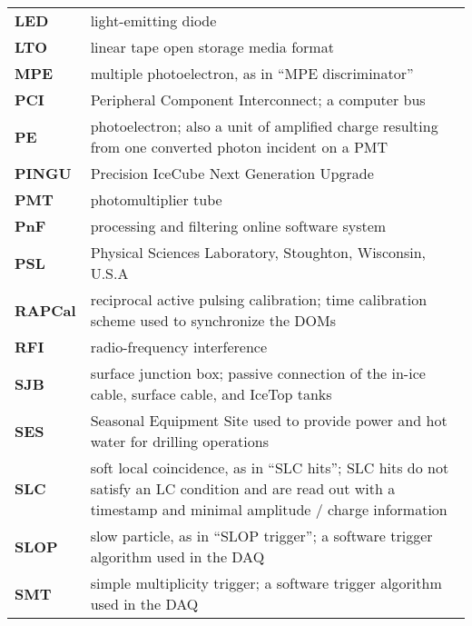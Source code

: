 \begin{longtable}{p{} p{}}
  \textbf{LED} & light-emitting diode \\

  \textbf{LTO} & linear tape open storage media format \\
  
  \textbf{MPE} & multiple photoelectron, as in ``MPE discriminator'' \\

  \textbf{PCI} & Peripheral Component Interconnect; a computer bus \\
  
  \textbf{PE} & photoelectron; also a unit of amplified charge resulting
  from one converted photon incident on a PMT \\

  \textbf{PINGU} & Precision IceCube Next Generation Upgrade \\
  
  \textbf{PMT} & photomultiplier tube \\

  \textbf{PnF} & processing and filtering online software system \\
  
  \textbf{PSL} & Physical Sciences Laboratory, Stoughton, Wisconsin, U.S.A \\

  \textbf{RAPCal} & reciprocal active pulsing calibration; time calibration
  scheme used to synchronize the DOMs \\

  \textbf{RFI} & radio-frequency interference \\

  \textbf{SJB} & surface junction box; passive connection of the in-ice
  cable, surface cable, and IceTop tanks \\

  \textbf{SES} & Seasonal Equipment Site used to provide power and hot
  water for drilling operations \\
  
  \textbf{SLC} & soft local coincidence, as in ``SLC hits''; SLC hits do
  not satisfy an LC condition and are read out with a timestamp and minimal
  amplitude / charge information \\

  \textbf{SLOP} & slow particle, as in ``SLOP trigger''; a software trigger
  algorithm used in the DAQ \\
  
  \textbf{SMT} & simple multiplicity trigger; a software trigger algorithm
  used in the DAQ \\


\end{longtable}
